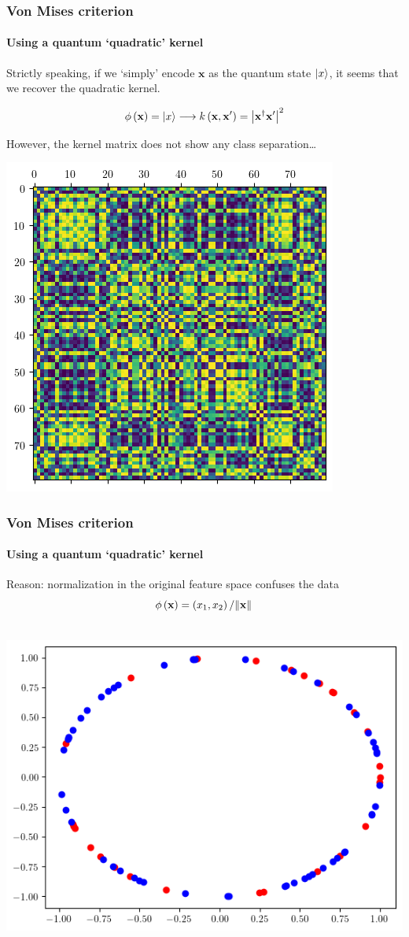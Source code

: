 \documentclass{beamer}
\begin{document}
    \begin{frame}
        \frametitle{Von Mises criterion}
        \framesubtitle{Using a quantum `quadratic' kernel}
        
        Strictly speaking, if we `simply' encode $\mathbf{x}$ as the quantum state $\ket{x}$, it seems that we recover the quadratic kernel.
        
        \centering
        \[
            \phi\left( \mathbf{x} \right) = \ket{x} \longrightarrow k\left( \mathbf{x}, \mathbf{x}^\prime \right) = \abs{\mathbf{x}^\dagger \mathbf{x}^\prime}^2
        \]

        \pause
        \begin{minipage}{.3\textwidth}
            However, the kernel matrix does not show any class separation\dots
        \end{minipage}
        \begin{minipage}{.6\textwidth}
            \centering
            \includegraphics[width=.6\textwidth]{pics/amp-enc-kernel-matrix.png}
        \end{minipage}  
        
    \end{frame}

    \begin{frame}
        \frametitle{Von Mises criterion}
        \framesubtitle{Using a quantum `quadratic' kernel}
    
        Reason: normalization in the original feature space confuses the data
        \[
            \phi\left( \mathbf{x} \right) = \left( x_1, x_2 \right)/\norm*{\mathbf{x}}
        \]

        \ \\
        \pause
        \centering
        \includegraphics[width=.6\textwidth]{pics/vm-data-2d-normalized.png}
    
    \end{frame}
    
\end{document}
